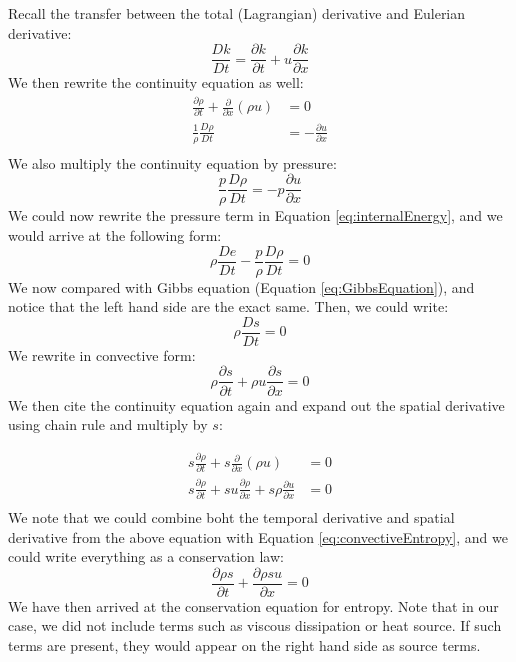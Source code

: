 \documentclass[a4paper]{article}
\numberwithin{equation}{section}
\begin{document}
Recall the transfer between the total (Lagrangian) derivative  and Eulerian derivative:
\begin{equation}
    \frac{D k}{Dt} = \frac{\partial k}{\partial t} + u \frac{\partial k}{\partial x}
\end{equation}
We then rewrite the continuity equation as well:
\begin{equation}
    \begin{split}
        \frac{\partial \rho}{\partial t} + \frac{\partial}{\partial x}(\rho u) &= 0\\
        \frac{1}{\rho} \frac{D \rho}{Dt} &= - \frac{\partial u}{\partial x}\\
    \end{split}
\end{equation}
We also multiply the continuity equation by pressure:
\begin{equation}
    \frac{p}{\rho} \frac{D \rho}{Dt} = - p \frac{\partial u}{\partial x}
\end{equation}
We could now rewrite the pressure term in Equation \ref{eq:internalEnergy}, and we would arrive at the following form:
\begin{equation}
    \rho \frac{D e}{D t} - \frac{p}{\rho} \frac{D \rho}{Dt} = 0
\end{equation}
We now compared with Gibbs equation (Equation \ref{eq:GibbsEquation}), and notice that the left hand side are the exact same. Then, we could write:
\begin{equation}
    \rho\frac{Ds}{Dt} = 0
\end{equation}
We rewrite in convective form:
\begin{equation}\label{eq:convectiveEntropy}
    \rho \frac{\partial s}{\partial t} + \rho u \frac{\partial s}{\partial x} = 0
\end{equation}
We then cite the continuity equation again and expand out the spatial derivative using chain rule and multiply by $s$:

\begin{equation}
    \begin{split}
        s\frac{\partial \rho}{\partial t} + s\frac{\partial}{\partial x}(\rho u) &= 0\\
        s\frac{\partial \rho}{\partial t} + su \frac{\partial \rho}{\partial x} + s\rho \frac{\partial u}{\partial x} &= 0\\
    \end{split}
\end{equation}
We note that we could combine boht the temporal derivative and spatial derivative from the above equation with Equation \ref{eq:convectiveEntropy}, and we could write everything as a conservation law:
\begin{equation}
    \frac{\partial \rho s}{\partial t} + \frac{\partial \rho s u}{\partial x} = 0
\end{equation}
We have then arrived at the conservation equation for entropy. Note that in our case, we did not include terms such as viscous dissipation or heat source. If such terms are present, they would appear on the right hand side as source terms.
\end{document}
